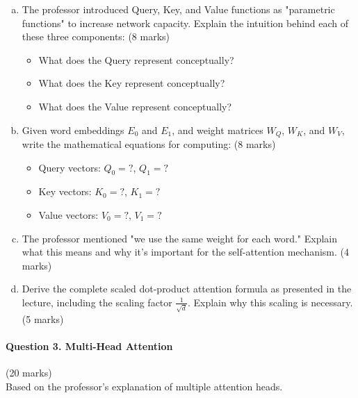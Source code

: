 \documentclass[12pt]{article}
\newcommand{\shortanswer}{\vspace{2cm}}
\newcommand{\mediumanswer}{\vspace{3cm}}
\begin{document}
\begin{enumerate}[(a)]
    \item The professor introduced Query, Key, and Value functions as "parametric functions" to increase network capacity. Explain the intuition behind each of these three components: \hfill (8 marks)
    \begin{itemize}
        \item What does the Query represent conceptually?
        \item What does the Key represent conceptually?
        \item What does the Value represent conceptually?
    \end{itemize}
    
    \mediumanswer
    
    \item Given word embeddings $E_0$ and $E_1$, and weight matrices $W_Q$, $W_K$, and $W_V$, write the mathematical equations for computing: \hfill (8 marks)
    \begin{itemize}
        \item Query vectors: $Q_0 = ?$, $Q_1 = ?$
        \item Key vectors: $K_0 = ?$, $K_1 = ?$  
        \item Value vectors: $V_0 = ?$, $V_1 = ?$
    \end{itemize}
    
    \shortanswer
    
    \item The professor mentioned "we use the same weight for each word." Explain what this means and why it's important for the self-attention mechanism. \hfill (4 marks)
    
    \shortanswer
    
    \item Derive the complete scaled dot-product attention formula as presented in the lecture, including the scaling factor $\frac{1}{\sqrt{d}}$. Explain why this scaling is necessary. \hfill (5 marks)
    
    \mediumanswer
\end{enumerate}

\newpage
\paragraph{Question 3. Multi-Head Attention}\hfill (20 marks)\\
Based on the professor's explanation of multiple attention heads.
\end{document}
